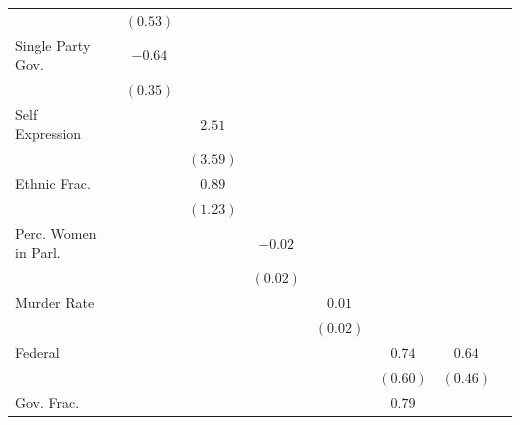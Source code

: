 \documentclass[a4paper]{article}\usepackage[]{graphicx}\usepackage[]{color}
\begin{document}
\begin{table}
\begin{center}
{\begin{tabular}{l c c c c c c c c }
                        &               & $(0.53)$      &              &             &              &              &              &              \\
Single Party Gov.       &               & $-0.64$       &              &             &              &              &              &              \\
                        &               & $(0.35)$      &              &             &              &              &              &              \\
Self Expression         &               &               & $2.51$       &             &              &              &              &              \\
                        &               &               & $(3.59)$     &             &              &              &              &              \\
Ethnic Frac.            &               &               & $0.89$       &             &              &              &              &              \\
                        &               &               & $(1.23)$     &             &              &              &              &              \\
Perc. Women in Parl.    &               &               &              & $-0.02$     &              &              &              &              \\
                        &               &               &              & $(0.02)$    &              &              &              &              \\
Murder Rate             &               &               &              &             & $0.01$       &              &              &              \\
                        &               &               &              &             & $(0.02)$     &              &              &              \\
Federal                 &               &               &              &             &              & $0.74$       & $0.64$       &              \\
                        &               &               &              &             &              & $(0.60)$     & $(0.46)$     &              \\
Gov. Frac.              &               &               &              &             &              & $0.79$       &              &              \\

\end{tabular}}
\end{center}
\end{table}
\end{document}
